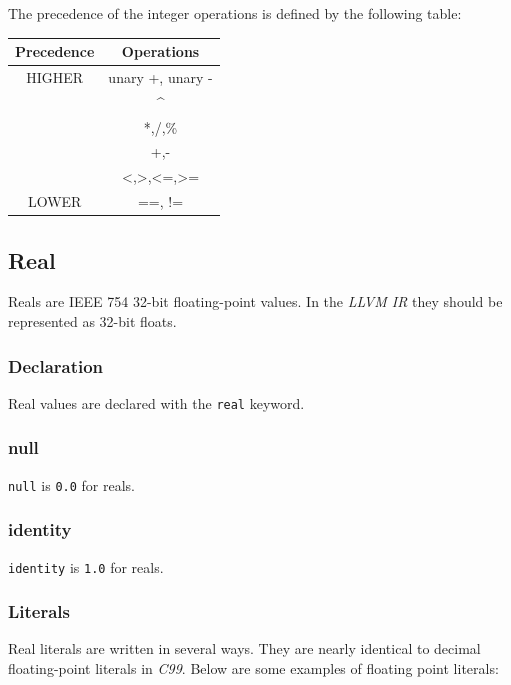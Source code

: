 \documentclass{article}
\begin{document}
		The precedence of the integer operations is defined by the following table:

		\begin{center}
			\begin{tabular}{|c|c|}
			\hline
			\textbf{Precedence} & \textbf{Operations} \\
			\hline
			HIGHER & unary +, unary - \\
			       & \textasciicircum \\
			       & *,/,\%		        \\
			       & +,-   		        \\
			       & <,>,<=,>=        \\
			LOWER  & ==, !=		        \\
			\hline
			\end{tabular}
		\end{center}


	\subsection{Real}\label{sec:real}

		Reals are IEEE 754 32-bit floating-point values. In the \textit{LLVM IR} they should be represented as 32-bit
		floats.

	\subsubsection{Declaration}

		Real values are declared with the \texttt{real} keyword.

	\subsubsection{null}

		\texttt{null} is \texttt{0.0} for reals.

	\subsubsection{identity}

		\texttt{identity} is \texttt{1.0} for reals.

	\subsubsection{Literals}
  \label{sssec:real_lit}

		Real literals are written in several ways. They are nearly identical to decimal floating-point literals in
		\textit{C99}. Below are some examples of floating point literals:
\end{document}
